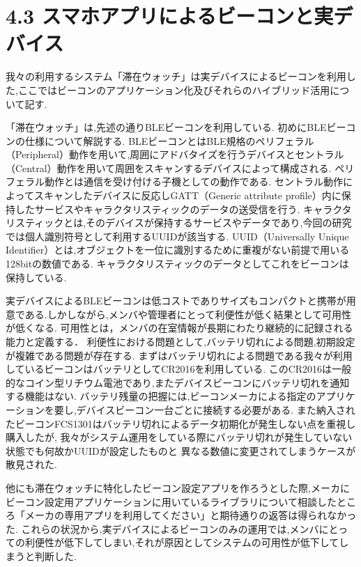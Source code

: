 \section*{4.3 スマホアプリによるビーコンと実デバイス}
我々の利用するシステム「滞在ウォッチ」は実デバイスによるビーコンを利用した,ここではビーコンのアプリケーション化及びそれらのハイブリッド活用について記す.

 「滞在ウォッチ」は,先述の通りBLEビーコンを利用している.
 初めにBLEビーコンの仕様について解説する.
 BLEビーコンとはBLE規格のペリフェラル（Peripheral）動作を用いて,周囲にアドバタイズを行うデバイスとセントラル（Central）動作を用いて周囲をスキャンするデバイスによって構成される.
 ペリフェラル動作とは通信を受け付ける子機としての動作である.
 セントラル動作によってスキャンしたデバイスに反応しGATT（Generic attribute profile）内に保持したサービスやキャラクタリスティックのデータの送受信を行う.
 キャラクタリスティックとは,そのデバイスが保持するサービスやデータであり,今回の研究では個人識別符号として利用するUUIDが該当する.
UUID（Universally Unique Identifier）とは,オブジェクトを一位に識別するために重複がない前提で用いる128bitの数値である.
キャラクタリスティックのデータとしてこれをビーコンは保持している.


 実デバイスによるBLEビーコンは低コストでありサイズもコンパクトと携帯が用意である.しかしながら,メンバや管理者にとって利便性が低く結果として可用性が低くなる.
 可用性とは，メンバの在室情報が長期にわたり継続的に記録される能力と定義する．
 利便性における問題として,バッテリ切れによる問題,初期設定が複雑である問題が存在する.
まずはバッテリ切れによる問題である我々が利用しているビーコンはバッテリとしてCR2016を利用している.
このCR2016は一般的なコイン型リチウム電池であり,またデバイスビーコンにバッテリ切れを通知する機能はない.
バッテリ残量の把握には,ビーコンメーカによる指定のアプリケーションを要し,デバイスビーコン一台ごとに接続する必要がある.
また納入されたビーコンFCS1301はバッテリ切れによるデータ初期化が発生しない点を重視し購入したが,
我々がシステム運用をしている際にバッテリ切れが発生していない状態でも何故かUUIDが設定したものと
異なる数値に変更されてしまうケースが散見された.

他にも滞在ウォッチに特化したビーコン設定アプリを作ろうとした際,メーカにビーコン設定用アプリケーションに用いているライブラリについて相談したところ「メーカの専用アプリを利用してください」と期待通りの返答は得られなかった.
これらの状況から,実デバイスによるビーコンのみの運用では,メンバにとっての利便性が低下してしまい,それが原因としてシステムの可用性が低下してしまうと判断した.









